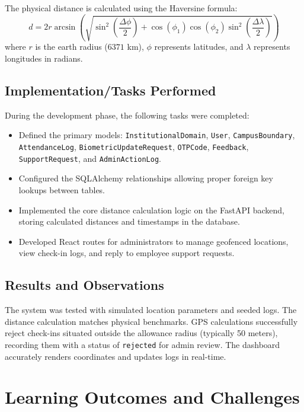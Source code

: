 \documentclass[12pt]{report}
\begin{document}
{The physical distance is calculated using the Haversine formula:
\begin{equation}
d = 2r \arcsin\left(\sqrt{\sin^2\left(\frac{\Delta \phi}{2}\right) + \cos(\phi_1)\cos(\phi_2)\sin^2\left(\frac{\Delta \lambda}{2}\right)}\right)
\end{equation}
where $r$ is the earth radius ($6371$ km), $\phi$ represents latitudes, and $\lambda$ represents longitudes in radians.

\section{Implementation/Tasks Performed}
During the development phase, the following tasks were completed:
\begin{itemize}
    \item Defined the primary models: \texttt{InstitutionalDomain}, \texttt{User}, \texttt{CampusBoundary}, \texttt{AttendanceLog}, \texttt{BiometricUpdateRequest}, \texttt{OTPCode}, \texttt{Feedback}, \texttt{SupportRequest}, and \texttt{AdminActionLog}.
    \item Configured the SQLAlchemy relationships allowing proper foreign key lookups between tables.
    \item Implemented the core distance calculation logic on the FastAPI backend, storing calculated distances and timestamps in the database.
    \item Developed React routes for administrators to manage geofenced locations, view check-in logs, and reply to employee support requests.
\end{itemize}

\section{Results and Observations}
The system was tested with simulated location parameters and seeded logs. The distance calculation matches physical benchmarks. GPS calculations successfully reject check-ins situated outside the allowance radius (typically 50 meters), recording them with a status of \texttt{rejected} for admin review. The dashboard accurately renders coordinates and updates logs in real-time.


\chapter{Learning Outcomes and Challenges}

}
\end{document}
